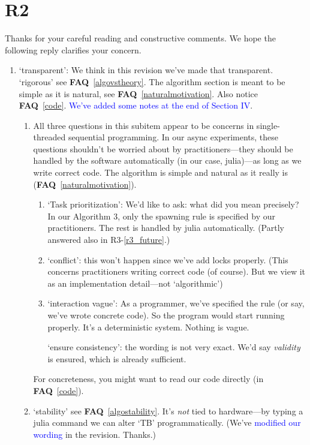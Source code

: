 \documentclass[11pt]{article}
\newcommand{\faq}[1]{\textbf{FAQ}~\ref{#1}}
\newcommand{\blue}[1]{\textcolor{blue}{#1}}
\begin{document}
\section{R2} \label{r2ans}
Thanks for your careful reading and constructive comments. We hope the following reply clarifies your concern.
\begin{enumerate}
    \item `transparent': We think in this revision we've made that transparent. \label{remainsvague} `rigorous' see \faq{algovstheory}. The algorithm section is meant to be simple as it is natural, see \faq{naturalmotivation}. Also notice \faq{code}. \blue{We've added some notes at the end of Section IV}.
    \begin{enumerate}
        \item All three questions in this subitem appear to be concerns in single-threaded sequential programming. In our async experiments, these questions shouldn't be worried about by practitioners---they should be handled by the software automatically (in our case, julia)---as long as we write correct code.
        The algorithm is simple and natural as it really is (\faq{naturalmotivation}).
        \begin{enumerate}
            \item `Task prioritization': We'd like to ask: what did you mean precisely? In our Algorithm 3, only the spawning rule is specified by our practitioners. The rest is handled by julia automatically. (Partly answered also in R3-\ref{r3_future}.)
            \item `conflict': this won't happen since we've add locks properly. (This concerns practitioners writing correct code (of course). But we view it as an implementation detail---not `algorithmic')
            \item `interaction vague': As a programmer, we've specified the rule (or say, we've wrote concrete code). So the program would start running properly. It's a deterministic system. Nothing is vague.
            \par `ensure consistency': the wording is not very exact. We'd say \textit{validity} is ensured, which is already sufficient.
        \end{enumerate}
        For concreteness, you might want to read our code directly (in \faq{code}).
        \item `stability' see \faq{algostability}. It's \textit{not} tied to hardware---by typing a julia command we can alter `TB' programmatically.
        (We've \blue{modified our wording} in the revision. Thanks.)

\end{enumerate}
\end{enumerate}
\end{document}
